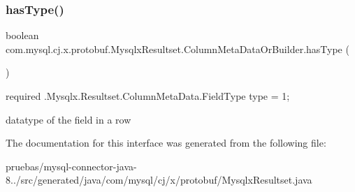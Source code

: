 \subsubsection{\texorpdfstring{has\+Type()}{hasType()}}
{\footnotesize\ttfamily boolean com.\+mysql.\+cj.\+x.\+protobuf.\+Mysqlx\+Resultset.\+Column\+Meta\+Data\+Or\+Builder.\+has\+Type (\begin{DoxyParamCaption}{ }\end{DoxyParamCaption})}

{\ttfamily required .Mysqlx.\+Resultset.\+Column\+Meta\+Data.\+Field\+Type type = 1;}


\begin{DoxyPre}
datatype of the field in a row
\end{DoxyPre}
 

The documentation for this interface was generated from the following file\+:\begin{DoxyCompactItemize}
\item 
pruebas/mysql-\/connector-\/java-\/8../src/generated/java/com/mysql/cj/x/protobuf/Mysqlx\+Resultset.\+java\end{DoxyCompactItemize}
